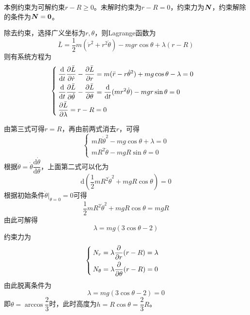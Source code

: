 \begin{solution}
本例约束为可解约束$r - R \geqslant 0$。未解时约束为$r-R=0$，约束力为$\boldsymbol{N}$，约束解除的条件为$\boldsymbol{N} = \boldsymbol{0}$。

除去约束，选择广义坐标为$r,\theta$，则Lagrange函数为
\begin{equation*}
	\bar{L} = \frac12 m(\dot{r}^2+r^2 \dot{\theta}) - mgr\cos \theta + \lambda(r-R)
\end{equation*}
则有系统方程为
\begin{equation*}
	\begin{cases}
		\displaystyle \frac{\mathrm{d}}{\mathrm{d} t} \frac{\partial \bar{L}}{\partial \dot{r}} - \frac{\partial \bar{L}}{\partial r} = m(\ddot{r} - r\dot{\theta}^2) + mg\cos \theta - \lambda = 0 \\[1.5ex]
		\displaystyle \frac{\mathrm{d}}{\mathrm{d} t} \frac{\partial \bar{L}}{\partial \dot{\theta}} - \frac{\partial \bar{L}}{\partial \theta} = \frac{\mathrm{d}}{\mathrm{d} t} (mr^2\dot{\theta}) - mgr\sin \theta = 0 \\[1.5ex]
		\displaystyle \frac{\partial \bar{L}}{\partial \lambda} = r-R = 0
	\end{cases}
\end{equation*}
\end{solution}
由第三式可得$r=R$，再由前两式消去$r$，可得
\begin{equation*}
	\begin{cases}
		mR\dot{\theta}^2 - mg\cos \theta + \lambda = 0 \\
		mR^2 \ddot{\theta} - mgR\sin \theta = 0
	\end{cases}
\end{equation*}
根据$\ddot{\theta} = \dot{\theta} \dfrac{\mathrm{d} \dot{\theta}}{\mathrm{d} \theta}$，上面第二式可以化为
\begin{equation*}
	\mathrm{d} \left(\frac12 mR^2 \dot{\theta}^2 + mgR\cos \theta\right) = 0
\end{equation*}
根据初始条件$\dot{\theta} \big|_{\theta=0} = 0$可得
\begin{equation*}
	\frac12 mR^2 \dot{\theta}^2 + mgR\cos \theta = mgR
\end{equation*}
由此可解得
\begin{equation*}
	\lambda = mg(3\cos \theta-2)
\end{equation*}
约束力为
\begin{equation*}
	\begin{cases}
		N_r = \lambda \dfrac{\partial}{\partial r}(r-R) = \lambda \\[1.5ex]
		N_\theta = \lambda \dfrac{\partial}{\partial \theta}(r-R) = 0
	\end{cases}
\end{equation*}
由此脱离条件为
\begin{equation*}
	\lambda = mg(3\cos \theta-2) = 0
\end{equation*}
即$\theta = \arccos \dfrac23$时，此时高度为$h = R\cos \theta = \dfrac23 R$。

